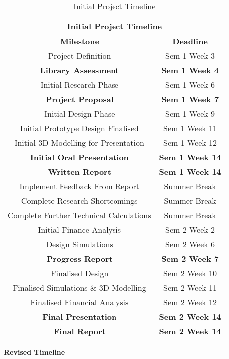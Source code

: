 \begin{table}[H]
	\centering
	\begin{tabular}{||c c||} 
		\hline
		\multicolumn{2}{|c|}{\textbf{Initial Project Timeline}} \\ [0.5ex] 
		\hline\hline
		\textbf{Milestone} & \textbf{Deadline} \\ 
		\hline\hline
		Project Definition 						& Sem 1 Week 3 \\ 
		\textbf{Library Assessment} 				& \textbf{Sem 1 Week 4} \\
		Initial Research Phase 					& Sem 1 Week 6 \\
		\textbf{Project Proposal} 					& \textbf{Sem 1 Week 7} \\
		Initial Design Phase 						& Sem 1 Week 9 \\
		Initial Prototype Design Finalised 		& Sem 1 Week 11 \\
		Initial 3D Modelling for Presentation 		& Sem 1 Week 12 \\
		\textbf{Initial Oral Presentation} 		& \textbf{Sem 1 Week 14} \\ 
		\textbf{Written Report} 					& \textbf{Sem 1 Week 14} \\ 
		Implement Feedback From Report 			& Summer Break \\
		Complete Research Shortcomings 			& Summer Break \\
		Complete Further Technical Calculations 	& Summer Break \\
		Initial Finance Analysis 					& Sem 2 Week 2 \\
		Design Simulations 						& Sem 2 Week 6 \\
		\textbf{Progress Report} 					& \textbf{Sem 2 Week 7} \\
		Finalised Design 							& Sem 2 Week 10 \\
		Finalised Simulations \& 3D Modelling 		& Sem 2 Week 11 \\
		Finalised Financial Analysis				& Sem 2 Week 12 \\
		\textbf{Final Presentation} 				& \textbf{Sem 2 Week 14} \\
		\textbf{Final Report} 						& \textbf{Sem 2 Week 14} \\ [1ex] 
		\hline
	\end{tabular}
	\caption{Initial Project Timeline}
	\label{table:timeline_original}
\end{table}    

\newpage
\textbf{Revised Timeline}

